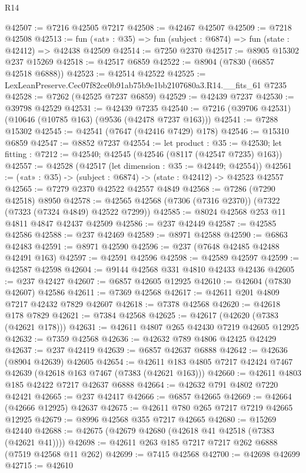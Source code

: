 \begin{lexlean}{R14}
\begin{coremodule}
@42507 := @7216 @42505 @7217
@42508 := @42467 @42507
@42509 := @7218 @42508
@42513 := fun («at» : @35) => fun (subject : @6874) => fun (state : @42412) => @42438 @42509
@42514 := @7250 @2370
@42517 := @8905 @15302 @237 @15269
@42518 := @42517 @6859
@42522 := @8904 (@7830 (@6857 @42518 @6888))
@42523 := @42514 @42522
@42525 := LexLeanPreserve.Cec07f82ce0b91ab75b9e1bb2107680a3.R14.__fits_61 @7235
@42528 := @7262 (@42525 @7237 @6859)
@42529 := @42439 @7237
@42530 := @39798 @42529
@42531 := @42439 @7235
@42540 := @7216 (@39706 @42531) (@10646 (@10785 @163) (@9536 (@42478 @7237 @163)))
@42541 := @7288 @15302
@42545 := @42541 (@7647 (@42416 @7429) @178)
@42546 := @15310 @6859
@42547 := @8852 @7237
@42554 := let product : @35 := @42530;
  let fitting : @7212 := @42540; @42545 (@42546 (@8117 (@42547 @7235) @163))
@42557 := @42528 (@42517 (let dimension : @35 := @42449; @42554))
@42561 := («at» : @35) -> (subject : @6874) -> (state : @42412) -> @42523 @42557
@42565 := @7279 @2370 @42522 @42557 @4849
@42568 := @7286 (@7290 @42518) @8950
@42578 := @42565 @42568 (@7306 (@7316 @2370)) (@7322 (@7323 (@7324 @4849) @42522 @7299))
@42585 := @8024 @42568 @253 @11 @4811 @4847 @42437 @42509
@42586 := @237 @42449
@42587 := @42585 @42586
@42588 := @237 @42469
@42589 := @8971 @42588
@42590 := @6863 @42483
@42591 := @8971 @42590
@42596 := @237 (@7648 @42485 @42488 @42491 @163)
@42597 := @42591 @42596
@42598 := @42589 @42597
@42599 := @42587 @42598
@42604 := @9144 @42568 @331 @4810 @42433 @42436
@42605 := @237 @42427
@42607 := @6857 @42605 @12925
@42610 := @42604 (@7830 @42607) @42586
@42611 := @7369 @42568
@42617 := @42611 @201 @4809 @7217 @42432 @7829 @42607
@42618 := @7378 @42568
@42620 := @42618 @178 @7829
@42621 := @7384 @42568
@42625 := @42617 (@42620 (@7383 (@42621 @178)))
@42631 := @42611 @4807 @265 @42430 @7219 @42605 @12925
@42632 := @7359 @42568
@42636 := @42632 @789 @4806 @42425 @42429
@42637 := @237 @42419
@42639 := @6857 @42637 @6888
@42642 := @42636 (@8904 @42639) @42605
@42654 := @42611 @183 @4805 @7217 @42424 @7467 @42639 (@42618 @163 @7467 (@7383 (@42621 @163)))
@42660 := @42611 @4803 @185 @42422 @7217 @42637 @6888
@42664 := @42632 @791 @4802 @7220 @42421
@42665 := @237 @42417
@42666 := @6857 @42665
@42669 := @42664 (@42666 @12925) @42637
@42675 := @42611 @780 @265 @7217 @7219 @42665 @12925
@42679 := @8996 @42568 @355 @7217 @42665
@42680 := @15269 @42440
@42688 := @42675 (@42679 @42680 (@42618 @41 @42518 (@7383 (@42621 @41))))
@42698 := @42611 @263 @185 @7217 @7217 @262 @6888 (@7519 @42568 @11 @262)
@42699 := @7415 @42568
@42700 := @42698 @42699
@42715 := @42610

\end{coremodule}
\end{lexlean}

